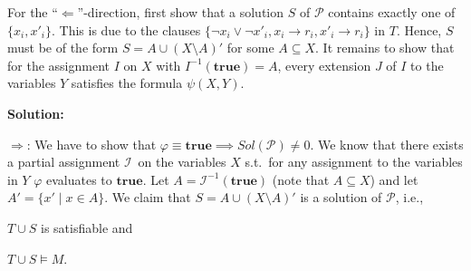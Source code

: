 \documentclass [11pt]{article}
\newcommand{\ra}{\rightarrow}
\newcommand{\La}{\Leftarrow}
\renewcommand{\phi}{\varphi}
\newcommand{\True}{\mathbf{true}}
\newcommand{\pap}{\ensuremath{\mathcal{P}}}
\newcommand{\mI}{\ensuremath{\mathcal{I}}}
\begin{document}
For the ``$\La$''-direction, first show that a solution $S$ of $\mathcal{P}$
contains exactly one  of $\{x_i, x'_i\}$. This is due to the 
clauses $\{\neg x_i \vee \neg x'_i, x_i \ra r_i, x'_i \ra r_i\}$ in 
$T$. Hence, $S$ must be of the form
$S = A \cup (X \setminus A)'$ for some $A \subseteq X$.
It remains to show that for the assignment $I$ on $X$ with $I^{-1}(\True) = A$, 
every extension $J$ of $I$ to the variables $Y$ satisfies the formula $\psi(X,Y)$.

\noindent
\textbf{Solution:}

$\Rightarrow$: 
We have to show that $\phi \equiv \True \implies Sol(\pap) \neq 0$.
We know that there exists a partial assignment \mI\ on the variables $X$ s.t.\ for any assignment to the variables in $Y$ $\phi$ evaluates to $\True$.
Let $A = \mI^{-1} (\True)$ (note that $A \subseteq X$) and let $A' = \{x' \mid x \in A\}$.
We claim that $S = A \cup (X \setminus A)'$ is a solution of \pap, i.e., 
\begin{inparaenum}
 \item $T \cup S$ is satisfiable and 
 \item $T \cup S \models M$.
\end{inparaenum}
\end{document}
